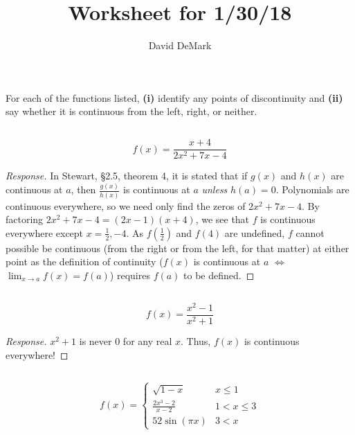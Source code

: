 \documentclass[english]{article}
\title{Worksheet for 1/30/18}
\author{David DeMark}
\date{\due}
\newcommand{\prob}[1]{\setcounter{section}{#1-1}\section{}}
\newcommand{\prt}[1]{\setcounter{subsection}{#1-1}\subsection{}}
\theoremstyle{remark}
\theoremstyle{definition}
\begin{document}
\prob{1} For each of the functions listed, \textbf{(i)} identify any points of discontinuity and \textbf{(ii)} say whether it is continuous from the left, right, or neither.

\prt{1} $$f(x)=\frac{x+4}{2x^2+7x-4}$$	
\begin{proof}[Response]
	In Stewart, \S2.5, theorem 4, it is stated that if $g(x)$ and $h(x)$ are continuous at $a$, then $\frac{g(x)}{h(x)}$ is continuous at $a$ \textit{unless} $h(a)=0$. Polynomials are continuous everywhere, so we need only find the zeros of $2x^2+7x-4$. By factoring $2x^2+7x-4=(2x-1)(x+4)$, we see that $f$ is continuous everywhere except $x=\frac{1}{2},-4$. As $f(\frac{1}{2})$ and $f(4)$ are undefined, $f$ cannot possible be continuous (from the right or from the left, for that matter) at either point as the definition of continuity ($f(x)$ is continuous at $a$ $\iff$ $\lim_{x\to a}f(x)=f(a)$) requires $f(a)$ to be defined. 
\end{proof}\vspace{1cm}
\prt{2}$$f(x)=\frac{x^2-1}{x^2+1}$$
\begin{proof}[Response]
	$x^2+1$ is never 0 for any real $x$. Thus, $f(x)$ is continuous everywhere!
\end{proof}\vspace{1cm}
\prt{3}
	\begin{equation*}f(x)=\begin{cases}
	\sqrt{1-x}& x\leq 1\\
	\frac{2x^3-2}{x-2}& 1<x\leq 3\\
	52\sin(\pi x)& 3<x
	
	\end{cases}\end{equation*}
\end{document}
